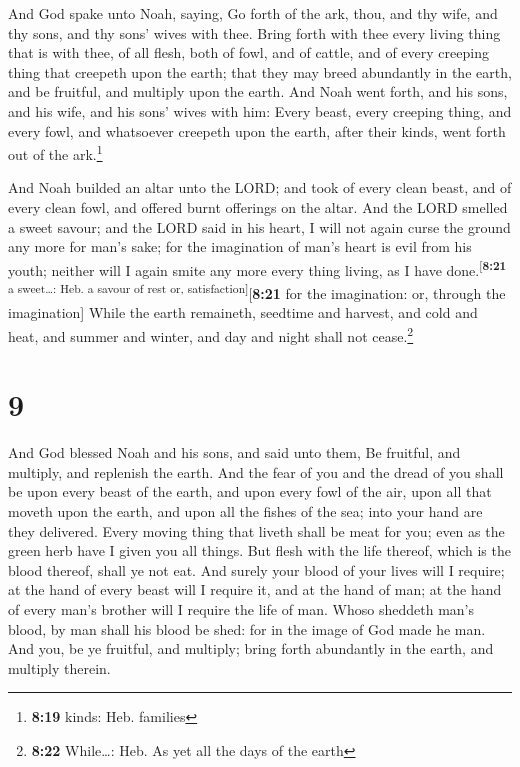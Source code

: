 And God spake unto Noah, saying,  Go
forth of the ark, thou, and thy wife, and thy sons, and thy sons' wives
with thee.  Bring forth with thee every living thing that
is with thee, of all flesh, both of fowl, and of cattle, and of every
creeping thing that creepeth upon the earth; that they may breed
abundantly in the earth, and be fruitful, and multiply upon the earth.
 And Noah went forth, and his sons, and his wife, and his
sons' wives with him:  Every beast, every creeping thing,
and every fowl, and whatsoever creepeth upon the earth, after their
kinds, went forth out of the ark.\footnote{\textbf{8:19} kinds: Heb.
  families}

 And Noah builded an altar unto the LORD; and took of
every clean beast, and of every clean fowl, and offered burnt offerings
on the altar.  And the LORD smelled a sweet savour; and
the LORD said in his heart, I will not again curse the ground any more
for man's sake; for the imagination of man's heart is evil from his
youth; neither will I again smite any more every thing living, as I have
done.\textsuperscript{{[}\textbf{8:21} a sweet\ldots: Heb. a savour of
rest or, satisfaction{]}}{[}\textbf{8:21} for the imagination: or,
through the imagination{]}  While the earth remaineth,
seedtime and harvest, and cold and heat, and summer and winter, and day
and night shall not cease.\footnote{\textbf{8:22} While\ldots: Heb. As
  yet all the days of the earth}

\hypertarget{section-8}{%
\section{9}\label{section-8}}

 And God blessed Noah and his sons, and said unto them, Be
fruitful, and multiply, and replenish the earth.  And the
fear of you and the dread of you shall be upon every beast of the earth,
and upon every fowl of the air, upon all that moveth upon the earth, and
upon all the fishes of the sea; into your hand are they delivered.
 Every moving thing that liveth shall be meat for you;
even as the green herb have I given you all things.  But
flesh with the life thereof, which is the blood thereof, shall ye not
eat.  And surely your blood of your lives will I require;
at the hand of every beast will I require it, and at the hand of man; at
the hand of every man's brother will I require the life of man.
 Whoso sheddeth man's blood, by man shall his blood be
shed: for in the image of God made he man.  And you, be ye
fruitful, and multiply; bring forth abundantly in the earth, and
multiply therein.

